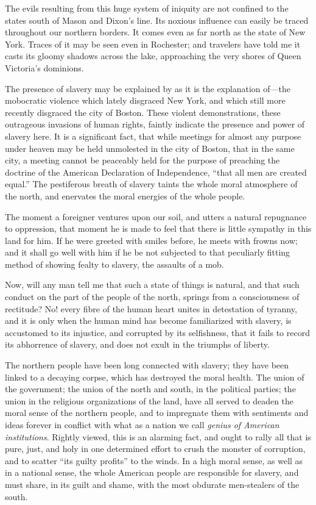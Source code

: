 The evils resulting from this huge system of iniquity are not confined
to the states south of Mason and Dixon's line. Its noxious influence can
easily be traced throughout our northern borders. It comes even as far
north as the state of New York. Traces of it may be seen even in
Rochester; and travelers have told me it casts its gloomy shadows across
the lake, approaching the very shores of Queen Victoria's dominions.

The presence of slavery may be explained by as it is the explanation
of---the mobocratic violence which lately disgraced New York, and which
still more recently disgraced the city of Boston. These violent
demonstrations, these outrageous invasions of human rights, faintly
indicate the presence and power of slavery here. It is a significant
fact, that while meetings for almost any purpose under heaven may be
held unmolested in the city of Boston, that in the same city, a meeting
cannot be peaceably held for the purpose of preaching the doctrine of
the American Declaration of Independence, ``that all men are created
equal.'' The pestiferous breath of slavery taints the whole moral
atmosphere of the north, and enervates the moral energies of the whole
people.

The moment a foreigner ventures upon our soil, and utters a natural
repugnance to oppression, that moment he is made to feel that there is
little sympathy in this land for him. If he were greeted with smiles
before, he meets with frowns now; and it shall go well with him if he be
not subjected to that peculiarly fitting method of showing fealty to
slavery, the assaults of a mob.

Now, will any man tell me that such a state of things is natural, and
that such conduct on the part of the people of the north, springs from a
consciousness of rectitude? No! every fibre of the human heart unites in
detestation of tyranny, and it is only when the human mind has become
familiarized with slavery, is accustomed to its injustice, and corrupted
by its selfishness, that it fails to record its abhorrence of slavery,
and does not exult in the triumphs of liberty.

{\protect\hypertarget{438}{}{}}The northern people have been long
connected with slavery; they have been linked to a decaying corpse,
which has destroyed the moral health. The union of the government; the
union of the north and south, in the political parties; the union in the
religious organizations of the land, have all served to deaden the moral
sense of the northern people, and to impregnate them with sentiments and
ideas forever in conflict with what as a nation we call \emph{genius of
American institutions}. Rightly viewed, this is an alarming fact, and
ought to rally all that is pure, just, and holy in one determined effort
to crush the monster of corruption, and to scatter ``its guilty
profits'' to the winds. In a high moral sense, as well as in a national
sense, the whole American people are responsible for slavery, and must
share, in its guilt and shame, with the most obdurate men-stealers of
the south.

